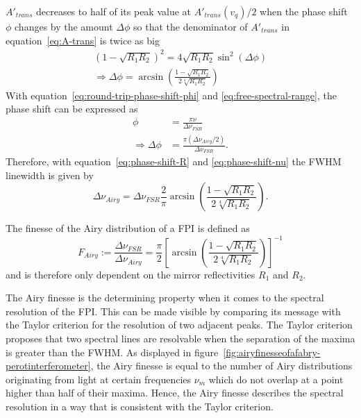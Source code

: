 $A'_{trans}$ decreases to half of its peak value at $A'_{trans}(v_q) / 2$ when the phase shift $\phi$ changes by the amount $\Delta\phi$ so that the denominator of $A'_{trans}$ in equation~\eqref{eq:A-trans}  is twice as big
\begin{align}
\left(1-\sqrt{R_1R_2}\right)^2=4\sqrt{R_1R_2}\sin^2(\Delta\phi) \\
\label{eq:phase-shift-R}
\Rightarrow \Delta\phi=\arcsin\left(\frac{1-\sqrt{R_1R_2}}{2\sqrt[4]{R_1R_2}}\right)
\end{align}
With equation~\eqref{eq:round-trip-phase-shift-phi} and \eqref{eq:free-spectral-range}, the phase shift can be expressed as
\begin{align}
\phi &= \frac{\pi \nu}{\Delta \nu_{FSR}} \\
\label{eq:phase-shift-nu}
\Rightarrow \Delta \phi &= \frac{\pi (\Delta \nu_{Airy}/2)}{\Delta \nu_{FSR}}.
\end{align}
Therefore, with equation~\eqref{eq:phase-shift-R} and \eqref{eq:phase-shift-nu} the \ac{FWHM} linewidth is given by
\begin{equation}
\Delta \nu_{Airy} = \Delta \nu_{FSR}\frac{2}{\pi}\arcsin\left(\frac{1-\sqrt{R_1R_2}}{2\sqrt[4]{R_1R_2}}\right).
\end{equation}

The finesse of the Airy distribution of a \ac{FPI} is defined as
\begin{equation}
\label{eq:f-airy}
F_{Airy} := \frac{\Delta \nu_{FSR}}{\Delta \nu_{Airy}} = \frac{\pi}{2}\left[\arcsin\left(\frac{1-\sqrt{R_1R_2}}{2\sqrt[4]{R_1R_2}}\right)\right]^{-1}
\end{equation}
and is therefore only dependent on the mirror reflectivities $R_1$ and $R_2$.

The Airy finesse is the determining property when it comes to the spectral resolution of the \ac{FPI}. This can be made visible by comparing its message with the Taylor criterion for the resolution of two adjacent peaks.
The Taylor criterion proposes that two spectral lines are resolvable when the separation of the maxima is greater than the \ac{FWHM}.
As displayed in figure~\ref{fig:airyfinesseofafabry-perotinterferometer}, the Airy finesse is equal to the number of Airy distributions originating from light at certain frequencies $\nu_m$ which do not overlap at a point higher than half of their maxima.
Hence, the Airy finesse describes the spectral resolution in a way that is consistent with the Taylor criterion.

